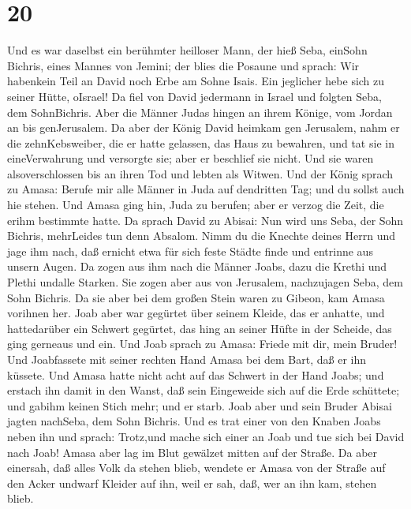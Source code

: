 \hypertarget{section-19}{%
\section{20}\label{section-19}}

 Und es war daselbst ein berühmter heilloser Mann, der hieß
Seba, einSohn Bichris, eines Mannes von Jemini; der blies die Posaune
und sprach: Wir habenkein Teil an David noch Erbe am Sohne Isais. Ein
jeglicher hebe sich zu seiner Hütte, oIsrael!  Da fiel von
David jedermann in Israel und folgten Seba, dem SohnBichris. Aber die
Männer Judas hingen an ihrem Könige, vom Jordan an bis genJerusalem.
 Da aber der König David heimkam gen Jerusalem, nahm er die
zehnKebsweiber, die er hatte gelassen, das Haus zu bewahren, und tat sie
in eineVerwahrung und versorgte sie; aber er beschlief sie nicht. Und
sie waren alsoverschlossen bis an ihren Tod und lebten als Witwen.
 Und der König sprach zu Amasa: Berufe mir alle Männer in
Juda auf dendritten Tag; und du sollst auch hie stehen.  Und
Amasa ging hin, Juda zu berufen; aber er verzog die Zeit, die erihm
bestimmte hatte.  Da sprach David zu Abisai: Nun wird uns
Seba, der Sohn Bichris, mehrLeides tun denn Absalom. Nimm du die Knechte
deines Herrn und jage ihm nach, daß ernicht etwa für sich feste Städte
finde und entrinne aus unsern Augen.  Da zogen aus ihm nach
die Männer Joabs, dazu die Krethi und Plethi undalle Starken. Sie zogen
aber aus von Jerusalem, nachzujagen Seba, dem Sohn Bichris. 
Da sie aber bei dem großen Stein waren zu Gibeon, kam Amasa vorihnen
her. Joab aber war gegürtet über seinem Kleide, das er anhatte, und
hattedarüber ein Schwert gegürtet, das hing an seiner Hüfte in der
Scheide, das ging gerneaus und ein.  Und Joab sprach zu
Amasa: Friede mit dir, mein Bruder! Und Joabfassete mit seiner rechten
Hand Amasa bei dem Bart, daß er ihn küssete.  Und Amasa
hatte nicht acht auf das Schwert in der Hand Joabs; und erstach ihn
damit in den Wanst, daß sein Eingeweide sich auf die Erde schüttete; und
gabihm keinen Stich mehr; und er starb. Joab aber und sein Bruder Abisai
jagten nachSeba, dem Sohn Bichris.  Und es trat einer von
den Knaben Joabs neben ihn und sprach: Trotz,und mache sich einer an
Joab und tue sich bei David nach Joab!  Amasa aber lag im
Blut gewälzet mitten auf der Straße. Da aber einersah, daß alles Volk da
stehen blieb, wendete er Amasa von der Straße auf den Acker undwarf
Kleider auf ihn, weil er sah, daß, wer an ihn kam, stehen blieb.

